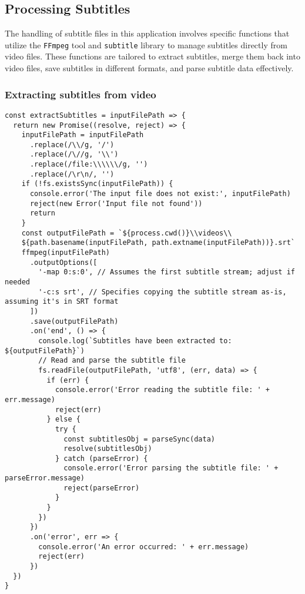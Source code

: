\subsection{Processing Subtitles}

The handling of subtitle files in this application involves specific functions that utilize the \texttt{FFmpeg} tool and \texttt{subtitle} library to manage subtitles directly from video files. These functions are tailored to extract subtitles, merge them back into video files, save subtitles in different formats, and parse subtitle data effectively.

\subsubsection{Extracting subtitles from video}

\begin{clisting}
\label{list:extract:subtitles}
\begin{verbatim}
const extractSubtitles = inputFilePath => {
  return new Promise((resolve, reject) => {
    inputFilePath = inputFilePath
      .replace(/\\/g, '/')
      .replace(/\//g, '\\')
      .replace(/file:\\\\\\/g, '')
      .replace(/\r\n/, '')
    if (!fs.existsSync(inputFilePath)) {
      console.error('The input file does not exist:', inputFilePath)
      reject(new Error('Input file not found'))
      return
    }
    const outputFilePath = `${process.cwd()}\\videos\\
    ${path.basename(inputFilePath, path.extname(inputFilePath))}.srt`
    ffmpeg(inputFilePath)
      .outputOptions([
        '-map 0:s:0', // Assumes the first subtitle stream; adjust if needed
        '-c:s srt', // Specifies copying the subtitle stream as-is, assuming it's in SRT format
      ])
      .save(outputFilePath)
      .on('end', () => {
        console.log(`Subtitles have been extracted to: ${outputFilePath}`)
        // Read and parse the subtitle file
        fs.readFile(outputFilePath, 'utf8', (err, data) => {
          if (err) {
            console.error('Error reading the subtitle file: ' + err.message)
            reject(err)
          } else {
            try {
              const subtitlesObj = parseSync(data)
              resolve(subtitlesObj)
            } catch (parseError) {
              console.error('Error parsing the subtitle file: ' + parseError.message)
              reject(parseError)
            }
          }
        })
      })
      .on('error', err => {
        console.error('An error occurred: ' + err.message)
        reject(err)
      })
  })
}
\end{verbatim}
\end{clisting}

